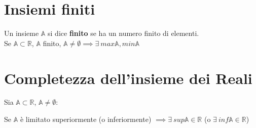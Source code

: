\section{Insiemi finiti}
Un insieme $\mathbb{A}$ si dice \textbf{finito} se ha un numero finito di elementi.\\
Se $\mathbb{A} \subset \mathbb{R}$, $\mathbb{A}$ finito, $\mathbb{A} \neq \emptyset \implies \exists\ max\mathbb{A}, min\mathbb{A}$

\label{sec: CompletezzaReali}
\section{Completezza dell'insieme dei Reali}
Sia $\mathbb{A} \subset \mathbb{R}$, $\mathbb{A} \neq \emptyset$:
\begin{center}
Se $\mathbb{A}$ è limitato superiormente (o inferiormente) $\implies \exists\ sup\mathbb{A} \in \mathbb{R}$ (o $\exists\ inf\mathbb{A} \in \mathbb{R}$)
\end{center}